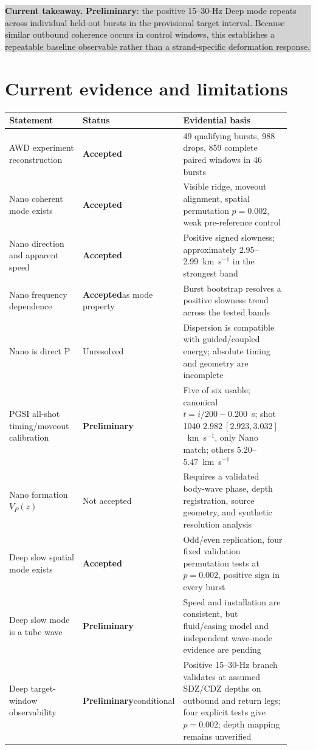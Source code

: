 \documentclass[11pt]{article}
\newcommand{\accepted}{\textcolor{accepted}{\textbf{Accepted}}}
\newcommand{\preliminary}{\textcolor{preliminary}{\textbf{Preliminary}}}
\newcommand{\takeaway}[1]{\par\smallskip\noindent\colorbox{lightgray}{\parbox{0.95\linewidth}{\textbf{Current takeaway.} #1}}\par\medskip}
\begin{document}
\takeaway{\preliminary: the positive 15--30-Hz Deep mode repeats across individual held-out bursts in the provisional target interval.  Because similar outbound coherence occurs in control windows, this establishes a repeatable baseline observable rather than a strand-specific deformation response.}

\section{Current evidence and limitations}

\begin{table}[H]
\centering
\small
\begin{tabular}{p{0.29\linewidth}p{0.16\linewidth}p{0.47\linewidth}}
\toprule
Statement & Status & Evidential basis \\
\midrule
AWD experiment reconstruction & \accepted & 49 qualifying bursts, 988 drops,
859 complete paired windows in 46 bursts \\
Nano coherent mode exists & \accepted & Visible ridge, moveout alignment,
spatial permutation $p=0.002$, weak pre-reference control \\
Nano direction and apparent speed & \accepted & Positive signed slowness;
approximately 2.95--2.99~km~s$^{-1}$ in the strongest band \\
Nano frequency dependence & \accepted as mode property & Burst bootstrap
resolves a positive slowness trend across the tested bands \\
Nano is direct P & Unresolved & Dispersion is compatible with guided/coupled
energy; absolute timing and geometry are incomplete \\
PGSI all-shot timing/moveout calibration & \preliminary & Five of six usable; canonical $t=i/200-0.200$~s; shot 1040 $2.982~[2.923,3.032]$~km~s$^{-1}$, only Nano match; others 5.20--5.47~km~s$^{-1}$ \\
Nano formation $V_P(z)$ & Not accepted & Requires a validated body-wave phase,
depth registration, source geometry, and synthetic resolution analysis \\
Deep slow spatial mode exists & \accepted & Odd/even replication, four fixed
validation permutation tests at $p=0.002$, positive sign in every burst \\
Deep slow mode is a tube wave & \preliminary & Speed and installation are
consistent, but fluid/casing model and independent wave-mode evidence are pending \\
Deep target-window observability & \preliminary conditional & Positive 15--30-Hz branch validates at assumed SDZ/CDZ depths on outbound and return legs; four explicit tests give $p=0.002$; depth mapping remains unverified \\

\end{tabular}
\end{table}
\end{document}
